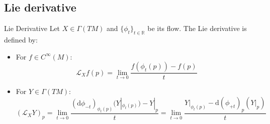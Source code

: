 \subsection{Lie derivative}
\begin{colordef}{Lie Derivative}{}
Let $X \in \Gamma(TM)$ and $\{\phi_t\}_{t \in \mathbb{R}}$ be its flow. The Lie derivative is defined by:
\begin{itemize}
    \item For $f \in C^\infty(M)$:
    \[
    \mathcal{L}_X f(p) = \lim_{t \to 0} \frac{f(\phi_t(p)) - f(p)}{t}
    \]
    \item For $Y \in \Gamma(TM)$:
    \[
    (\mathcal{L}_X Y)_p
    = \lim_{t \to 0} \frac{(\mathrm{d}\phi_{-t})_{\phi_t(p)}(Y|_{\phi_t(p)}) - Y|_p}{t}
    = \lim_{t \to 0} \frac{Y|_{\phi_t(p)} - \mathrm{d}(\phi_{+t})_p(Y|_p)}{t}
    \]
\end{itemize}
\end{colordef}












